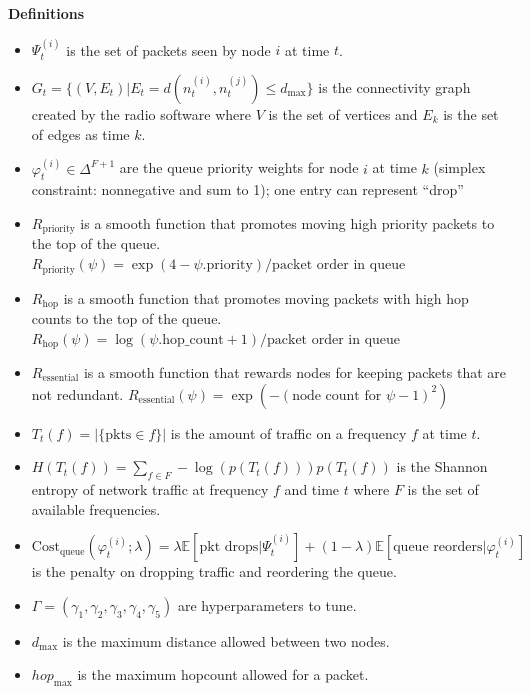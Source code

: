 \documentclass{article}
\begin{document}
\textbf{Definitions}
\begin{itemize}
    \item $\Psi_{t}^{(i)}$ is the set of packets seen by node $i$ at time $t$.
    \item $G_{t} = \{ (V, E_{t}) | E_{t} = d(n_{t}^{(i)}, n_{t}^{(j)}) \le d_{\text{max}} \}$ is the connectivity graph created by the radio software where $V$ is the set of vertices and $E_{k}$ is the set of edges as time $k$.
    \item $\varphi_{t}^{(i)}\in\Delta^{F+1}$ are the queue priority weights for node $i$ at time $k$ (simplex constraint: nonnegative and sum to 1); one entry can represent ``drop''
    \item $R_{\text{priority}}$ is a smooth function that promotes moving high priority packets to the top of the queue. $R_{\text{priority}}(\psi) = \exp( 4 - \psi.\text{priority}) / \text{packet order in queue}$


    \item $R_{\text{hop}}$ is a smooth function that promotes moving packets with high hop counts to the top of the queue. $R_{\text{hop}}(\psi) = \log(\psi.\text{hop\_count} + 1) / \text{packet order in queue}$

    \item $R_{\text{essential}}$ is a smooth function that rewards nodes for keeping packets that are not redundant. $R_{\text{essential}}(\psi) = \exp(- (\text{node count for }\psi - 1)^{2})$

    \item $T_{t}(f) = | \{ \text{pkts} \in f\} |$ is the amount of traffic on a frequency $f$ at time $t$.
    \item $H(T_{t}(f))= \sum _{f \in F} -\log(p(T_{t}(f))) p(T_{t}(f))$ is the Shannon entropy of network traffic at frequency $f$ and time $t$ where $F$ is the set of available frequencies.
    \item $\text{Cost}_{\text{queue}}(\varphi_{t}^{(i)}; \lambda) = \lambda \mathbb{E}[\text{pkt drops}| \Psi_{t}^{(i)}] + (1 - \lambda) \mathbb{E}[\text{queue reorders}| \varphi_{t}^{(i)}]$ is the penalty on dropping traffic and reordering the queue.
    \item $\Gamma = (\gamma_{1}, \gamma_{2}, \gamma_{3}, \gamma_{4}, \gamma_{5})$ are hyperparameters to tune.
    \item $d_{\max}$ is the maximum distance allowed between two nodes.
    \item $hop_{\max}$ is the maximum hopcount allowed for a packet.
\end{itemize}
\end{document}
